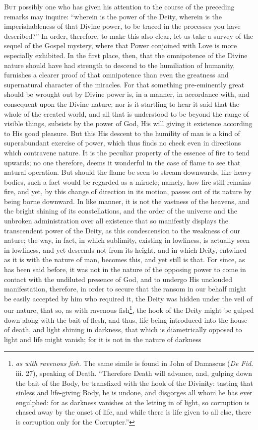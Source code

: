 \textsc{But} possibly one who has given his attention to the course of the preceding remarks may inquire: “wherein is the power of the Deity, wherein is the imperishableness of that Divine power, to be traced in the processes you have described?” In order, therefore, to make this also clear, let us take a survey of the sequel of the Gospel mystery, where that Power conjoined with Love is more especially exhibited. In the first place, then, that the omnipotence of the Divine nature should have had strength to descend to the humiliation of humanity, furnishes a clearer proof of that omnipotence than even the greatness and supernatural character of the miracles. For that something pre-eminently great should be wrought out by Divine power is, in a manner, in accordance with, and consequent upon the Divine nature; nor is it startling to hear it said that the whole of the created world, and all that is understood to be beyond the range of visible things, subsists by the power of God, His will giving it existence according to His good pleasure. But this His descent to the humility of man is a kind of superabundant exercise of power, which thus finds no check even in directions which contravene nature. It is the peculiar property of the essence of fire to tend upwards; no one therefore, deems it wonderful in the case of flame to see that natural operation. But should the flame be seen to stream downwards, like heavy bodies, such a fact would be regarded as a miracle; namely, how fire still remains fire, and yet, by this change of direction in its motion, passes out of its nature by being borne downward. In like manner, it is not the vastness of the heavens, and the bright shining of its constellations, and the order of the universe and the unbroken administration over all existence that so manifestly displays the transcendent power of the Deity, as this condescension to the weakness of our nature; the way, in fact, in which sublimity, existing in lowliness, is actually seen in lowliness, and yet descends not from its height, and in which Deity, entwined as it is with the nature of man, becomes this, and yet still is that. For since, as has been said before, it was not in the nature of the opposing power to come in contact with the undiluted presence of God, and to undergo His unclouded manifestation, therefore, in order to secure that the ransom in our behalf might be easily accepted by him who required it, the Deity was hidden under the veil of our nature, that so, as with ravenous fish\footnote{\emph{as with ravenous fish.} The same simile is found in John of Damascus (\emph{De Fid.} iii. 27), speaking of Death. “Therefore Death will advance, and, gulping down the bait of the Body, be transfixed with the hook of the Divinity: tasting that sinless and life-giving Body, he is undone, and disgorges all whom he has ever engulphed: for as darkness vanishes at the letting in of light, so corruption is chased away by the onset of life, and while there is life given to all else, there is corruption only for the Corrupter.”}, the hook of the Deity might be gulped down along with the bait of flesh, and thus, life being introduced into the house of death, and light shining in darkness, that which is diametrically opposed to light and life might vanish; for it is not in the nature of darkness 